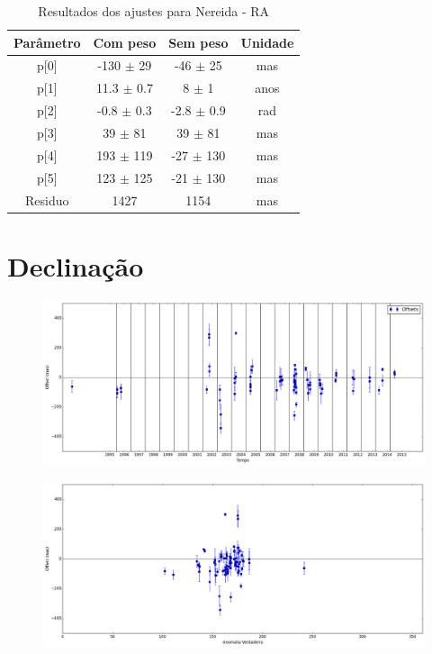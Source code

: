 \documentclass[11pt,a4paper]{report}
\begin{document}
\begin{table}[h!]
\caption{\label{Tab: Nereida-RA} Resultados dos ajustes para Nereida - RA}
\begin{centering}
\begin{tabular}{cccc}
\hline
\hline
Parâmetro & Com peso & Sem peso & Unidade\tabularnewline
\hline
p[0] & -130 $\pm$ 29 & -46 $\pm$ 25 & mas\\
p[1] & 11.3 $\pm$ 0.7 & 8 $\pm$ 1 & anos\\
p[2] & -0.8 $\pm$ 0.3 & -2.8 $\pm$ 0.9 & rad\\
p[3] & 39 $\pm$ 81 & 39 $\pm$ 81 & mas\\
p[4] & 193 $\pm$ 119 & -27 $\pm$ 130 & mas\\
p[5] & 123 $\pm$ 125 & -21 $\pm$ 130 & mas\\
Residuo & 1427 & 1154 & mas\\
\hline 
\end{tabular} 
\par\end{centering}
\end{table}

\section*{Declinação}

\begin{figure}[h]
\includegraphics[scale=0.35]{Nereida/DEC.png} 
\end{figure}

\begin{figure}[h]
\includegraphics[scale=0.35]{Nereida/DEC_anom.png}  
\end{figure}
\end{document}
